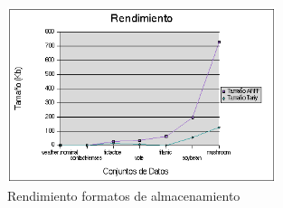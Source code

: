\begin{figure}[h]
\centering
\includegraphics[width=0.7\textwidth]{images/formatos.png}
\caption{Rendimiento formatos de almacenamiento}
\end{figure}
